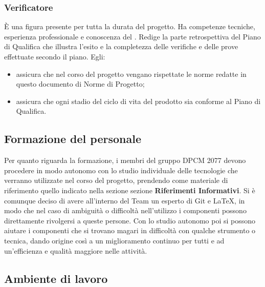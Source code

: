 \subsubsection{Verificatore}
È una figura presente per tutta la durata del progetto. Ha competenze tecniche, esperienza professionale e conoscenza del .	
Redige la parte retrospettiva del Piano di Qualifica che illustra l'esito e la completezza delle verifiche e delle prove effettuate secondo il piano.
Egli:
\begin{itemize}
\item{assicura che nel corso del progetto vengano rispettate le norme redatte in questo documento di Norme di Progetto;}
\item{assicura che ogni stadio del ciclo di vita del prodotto sia conforme al Piano di Qualifica.}
\end{itemize}


\subsection{Formazione del personale}
Per quanto riguarda la formazione, i membri del gruppo DPCM 2077 devono procedere in modo autonomo con lo studio individuale delle tecnologie che verranno utilizzate nel corso del progetto, prendendo come materiale di riferimento quello indicato nella sezione sezione \textbf{Riferimenti Informativi}. Si è comunque deciso di avere all'interno del Team un esperto di Git e {\LaTeX}, in modo che nel caso di ambiguità o difficoltà nell'utilizzo i componenti possono direttamente
rivolgersi a queste persone. Con lo studio autonomo poi si possono aiutare i componenti che si trovano magari in difficoltà con qualche strumento o tecnica, dando origine così a un miglioramento continuo per tutti e ad un'efficienza e qualità maggiore nelle attività. 



\subsection{Ambiente di lavoro}

